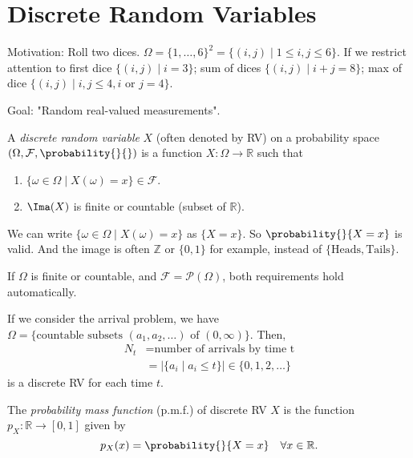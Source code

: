 \section{Discrete Random Variables}
Motivation: Roll two dices. \(\Omega=\{1, \ldots,6\}^2 = \{(i,j)\mid 1\leq i,j \leq 6\}\). If we restrict attention to first dice \(\{(i,j)\mid i = 3\}\); sum of dices \(\{(i,j) \mid i + j = 8\}\); max of dice \(\{(i,j)\mid i,j \leq 4, i\text{ or }j=4\}\).

Goal: "Random real-valued measurements".

\begin{definition}
    A \textit{discrete random variable} \(X\) (often denoted by RV) on a probability space \((\Omega, \mathcal{F}, \probability{}{})\) is a function \(X: \Omega\to \mathbb{R}\) such that
    \begin{enumerate}
        \item \(\{\omega \in \Omega\mid X(\omega) = x\}\in \mathcal{F} \).
        \item \(\Ima(X)\) is finite or countable (subset of \(\mathbb{R}\)).
    \end{enumerate}
    We can write \(\{\omega \in \Omega\mid X(\omega) = x\}\) as \(\{X = x\}\). So \(\probability{}{X=x} \) is valid. And the image is often \(\mathbb{Z}\) or \(\{0,1\}\) for example, instead of \(\{\text{Heads}, \text{Tails}\}\).

    If \(\Omega\) is finite or countable, and \(\mathcal{F}=\mathcal{P} (\Omega)\), both requirements hold automatically.
\end{definition}
\begin{example}
    If we consider the arrival problem, we have \(\Omega=\{\text{countable subsets } (a_1,a_2, \ldots) \text{ of }(0, \infty)\}\). Then,
    \begin{align*}
        N_t &= \text{number of arrivals by time t}\\
        &= \left\vert \{a_i \mid a_i \leq t\} \right\vert \in \{0,1,2, \ldots\}
    \end{align*}
    is a discrete RV for each time \(t\).
\end{example}
\begin{definition}
    The \textit{probability mass function} (p.m.f.) of discrete RV \(X\) is the function \(p_X:\mathbb{R} \to [0,1]\) given by
    \[
        p_X(x) = \probability{}{X = x}\quad \forall x \in \mathbb{R}.
    \]
\end{definition}
